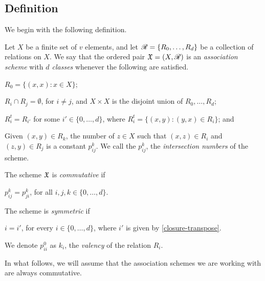 \documentclass[../../../main]{subfiles}
\begin{document}

\subsection{Definition}

 We begin with the following definition.
 
 \begin{defin}\label{ass-scheme-def}
  Let $X$ be a finite set of $v$ elements, and let $\mathscr{R}=\{R_0, \dots, R_d\}$ be
  a collection of relations on $X$. We say that the ordered pair $\mathfrak{X}=(X,\mathscr{R})$ is
  an {\it association scheme} with {\it $d$ classes} whenever the following are
  satisfied. 
  \begin{defenum}
   \item $R_0=\{(x,x) : x \in X\}$;
   \item $R_i \cap R_j = \emptyset$, for $i \neq j$, and $X \times X$ is the disjoint union of $R_0, \dots, R_d$;
   \item\label{closure-transpose} $R_i^t=R_{i'}$ for some $i' \in \{0, \dots, d\}$, where $R_i^t=\{(x,y) : (y,x) \in R_i\}$; and
   \item Given $(x,y) \in R_k$, the number of $z \in X$ such that $(x,z) \in
     R_i$ and $(z,y) \in R_j$ is a constant $p_{ij}^k$. We call the $p_{ij}^k$,
     the {\it intersection numbers} of the scheme. 
  \end{defenum}
  The scheme $\mathfrak{X}$ is {\it commutative} if
  \begin{defenum}[resume]
   \item $p_{ij}^k=p_{ji}^k$, for all $i,j,k \in \{0, \dots, d\}$.
  \end{defenum}
  The scheme is {\it symmetric} if
  \begin{defenum}[resume]
  \item $i=i'$, for every $i \in \{0, \dots, d\}$, where $i'$ is given by
    \ref{closure-transpose}. 
  \end{defenum}
  We denote $p_{ii}^0$ as $k_i$, the {\it valency} of the relation $R_i$.
 \end{defin}
 
 In what follows, we will assume that the association schemes we are working
 with are always commutative. 
 
 \dinkus

\end{document}
